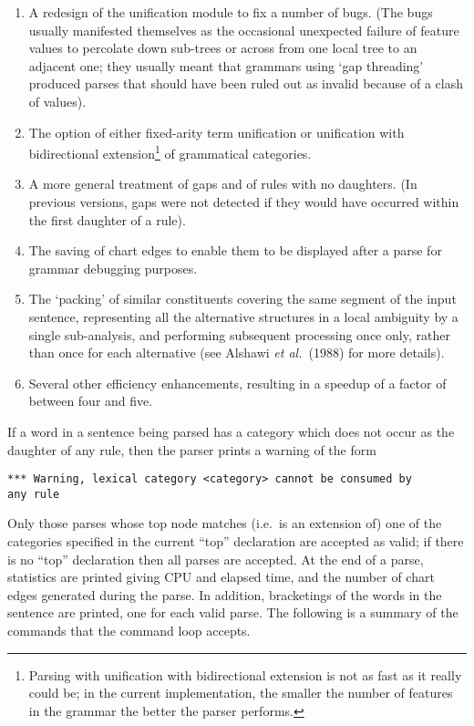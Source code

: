 \begin{enumerate}
\item A redesign of the unification module to fix a number of bugs. (The bugs
usually manifested themselves as the occasional unexpected failure of feature
values to percolate down sub-trees or across from one local tree to an adjacent
one; they usually meant that grammars using `gap threading' produced parses
that should have been ruled out as invalid because of a clash of values).

\item The option of either fixed-arity term unification or unification
with bidirectional extension\footnote{Parsing with unification with
bidirectional extension is not as fast as it really could be; in the current
implementation, the smaller the number of features in the grammar the better
the parser performs.}
of grammatical categories.

\item A more general treatment of gaps and of rules with no daughters.
(In previous versions, gaps were not detected if they would have occurred
within the first daughter of a rule).

\item The saving of chart edges to enable them to be displayed after
a parse for grammar debugging purposes.

\item The `packing' of similar constituents covering the same segment
of the input sentence, representing all the alternative structures
in a local ambiguity by a single sub-analysis, and performing subsequent
processing once only, rather than once for each alternative (see Alshawi
{\it et al.}\ (1988) for more details).

\item Several other efficiency enhancements, resulting in a speedup of a
factor of between four and five.
\end{enumerate}

If a word in a sentence being parsed has a category which does not occur
as the daughter of any rule, then the parser prints a warning of the form
\begin{ex}
\begin{verbatim}
*** Warning, lexical category <category> cannot be consumed by
any rule
\end{verbatim}
\end{ex}

Only those parses whose top node matches (i.e.\ is
an extension of) one of the categories specified in the current ``top''
declaration are accepted as valid; if there is no ``top'' declaration
then all parses are accepted. At the end of a parse, statistics are printed
giving CPU and elapsed time, and the number of chart edges generated
during the parse. In addition, bracketings of the words in the sentence
are printed, one for each valid parse. The following is a summary of the
commands that the command loop accepts.


